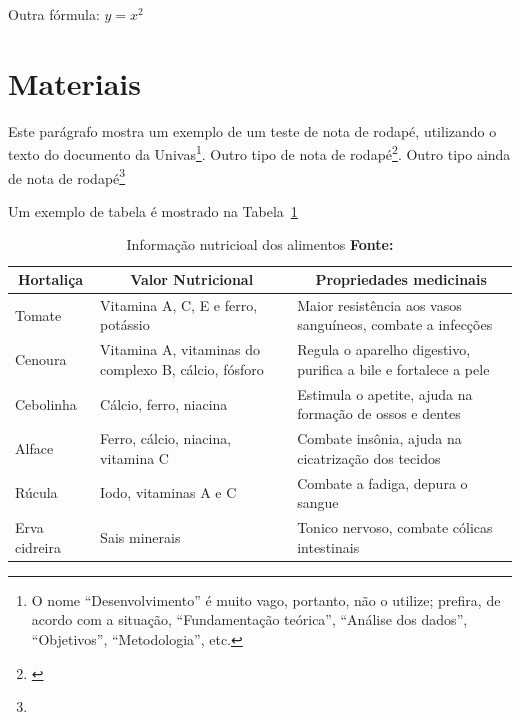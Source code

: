 \par Outra fórmula: $y=x^2$

\section{Materiais}
\label{sec:materiais}

\par Este parágrafo mostra um exemplo de um teste de nota de rodapé, utilizando o texto do documento da Univas\footnote{O nome “Desenvolvimento” é muito vago, portanto, não o utilize; prefira, de acordo com a situação, ``Fundamentação teórica'', ``Análise dos dados'', ``Objetivos'', ``Metodologia'', etc. }. Outro tipo de nota de rodapé\footnote{\cite{correa2003plantas}}.  Outro tipo ainda de nota de rodapé\footnote{}


\par Um exemplo de tabela é mostrado na Tabela~\ref{tab:informativa}


\begin{table} [h]
  \caption[Informação nutricioal dos alimentos]
          {Informação nutricioal dos alimentos \textbf{Fonte:} \cite{correa2003plantas}}
  \centering
  \begin{tabular}{|p{0.7in}|p{2in}|p{3in}|}
    \hline 
    \multicolumn{1}{|c|}{\textbf{Hortaliça}} & \multicolumn{1}{c|}{\textbf{Valor Nutricional}} & \multicolumn{1}{c|}{\textbf{Propriedades medicinais}} \\
    \hline 
Tomate
&Vitamina A, C, E e ferro, potássio
&Maior resistência aos vasos sanguíneos, combate a infecções\\
    \hline 
Cenoura
&Vitamina A, vitaminas do complexo B, cálcio, fósforo
&Regula o aparelho digestivo, purifica a bile e fortalece a pele\\
    \hline
Cebolinha
&Cálcio, ferro, niacina
&Estimula o apetite, ajuda na formação de ossos e dentes\\

    \hline
Alface
&Ferro, cálcio, niacina, vita\-mina C
&Combate insônia, ajuda na cicatrização dos tecidos\\

    \hline
Rúcula
&Iodo, vitaminas A e C
&Combate a fadiga, depura o sangue\\

    \hline
Erva cidreira
&Sais minerais
&Tonico nervoso, combate cólicas intestinais\\

    \hline 
  \end{tabular}
  \label{tab:informativa}
\end{table}

